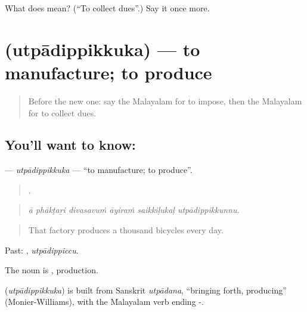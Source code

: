 \begin{tcolorbox}[breakable,colback=teal!4,colframe=teal!35!black,title={Before you move on}]
What does  mean? (\textquotedblleft{}To collect dues\textquotedblright{}.) Say it once more.
\end{tcolorbox}
\section[\texorpdfstring{\ml{ഉത്പാദിപ്പിക്കുക} (utpādippikkuka)}{ഉത്പാദിപ്പിക്കുക (utpādippikkuka)}]{ (utpādippikkuka) — to manufacture; to produce}

\label{lesson:ML-C459-utpadippikkuka}



\begin{quote}
Before the new one: say the Malayalam for to impose, then the Malayalam for to collect dues.
\end{quote}

\subsection*{You'll want to know: }
\textbf{} — \emph{utpādippikkuka} — \textquotedblleft{}to manufacture; to produce\textquotedblright{}.

\begin{quote}
     .
\end{quote}

\begin{quote}
\emph{ā phākṭaṟi divasavuṁ āyiraṁ saikkiḷukaḷ utpādippikkunnu.}
\end{quote}

\begin{quote}
That factory produces a thousand bicycles every day.
\end{quote}

Past: , \emph{utpādippiccu}.

The noun is , production.

\begin{cousinweb}
\textbf{} (\emph{utpādippikkuka}) is built from Sanskrit \emph{utpādana}, \textquotedblleft{}bringing forth, producing\textquotedblright{} (Monier-Williams), with the Malayalam verb ending -.
\end{cousinweb}

